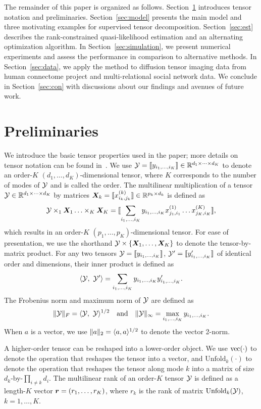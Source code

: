 \documentclass[12pt]{article}
\theoremstyle{definition}
\theoremstyle{definition}
\begin{document}
The remainder of this paper is organized as follows. Section~\ref{sec:pre} introduces tensor notation and preliminaries. Section~\ref{sec:model} presents the main model and three motivating examples for supervised tensor decomposition. Section~\ref{sec:est} describes the rank-constrained quasi-likelihood estimation and an alternating optimization algorithm. In Section~\ref{sec:simulation}, we present numerical experiments and assess the performance in comparison to alternative methods. In Section~\ref{sec:data}, we apply the method to diffusion tensor imaging data from human connectome project and multi-relational social network data. We conclude in Section~\ref{sec:con} with discussions about our findings and avenues of future work.

\section{Preliminaries}\label{sec:pre}
We introduce the basic tensor properties used in the paper; more details on tensor notation can be found in~\cite{kolda2009tensor}. We use $\mathcal{Y}=\llbracket y_{i_1,\ldots,i_K} \rrbracket\in \mathbb{R}^{d_1\times \cdots\times d_K}$ to denote an order-$K$ $(d_1,\ldots,d_K)$-dimensional tensor, where $K$ corresponds to the number of modes of $\mathcal{Y}$ and is called the order. The multilinear multiplication of a tensor $\mathcal{Y}\in\mathbb{R}^{d_1\times \cdots\times d_K}$ by matrices $\bm X_k=\llbracket x_{i_k,j_k}^{(k)} \rrbracket\in\mathbb{R}^{p_k\times d_k}$ is defined as
\begin{equation}
\mathcal{Y} \times_1\bm X_1\ldots \times_K \bm X_K=\llbracket \sum_{i_1,\ldots,i_K}y_{i_1,\ldots,i_K}x_{j_1,i_1}^{(1)}\ldots x_{j_K,i_K}^{(K)} \rrbracket,
\end{equation}
which results in an order-$K$ $(p_1,\ldots,p_K)$-dimensional tensor. For ease of presentation, we use the shorthand $\mathcal{Y}\times\{\bm X_1,\ldots,\bm X_K\}$ to denote the tensor-by-matrix product. For any two tensors $\mathcal{Y}=\llbracket y_{i_1,\ldots,i_K} \rrbracket$, $\mathcal{Y}'=\llbracket y'_{i_1,\ldots,i_K} \rrbracket$ of identical order and dimensions, their inner product is defined as 
\[
\langle \mathcal{Y},\ \mathcal{Y}'\rangle =\sum_{i_1,\ldots,i_K}y_{i_1,\ldots,i_K}y'_{i_1,\ldots,i_K}.
\] 
The Frobenius norm and maximum norm of $\mathcal{Y}$ are defined as 
\[
\lVert\mathcal{Y}\rVert_F=\langle \mathcal{Y},\ \mathcal{Y} \rangle^{1/2}\quad \text{and}\quad \lVert\mathcal{Y}\rVert_\infty=\max_{i_1,\ldots,i_K}y_{i_1,\ldots,i_K}.
\]
When $a$ is a vector, we use $\lVert a\rVert_2=\langle a,a \rangle^{1/2}$ to denote the vector 2-norm. 

A higher-order tensor can be reshaped into a lower-order object. We use $\textup{vec}(\cdot)$ to denote the operation that reshapes the tensor into a vector, and $\text{Unfold}_k(\cdot)$ to denote the operation that reshapes the tensor along mode $k$ into a matrix of size $d_k$-by-$\prod_{i\neq k}d_i$. The multilinear rank of an order-$K$ tensor $\mathcal{Y}$ is defined as a length-$K$ vector $\bm{r}=(r_1,\ldots,r_K)$, where $r_k$ is the rank of matrix $\textup{Unfold}_k(\mathcal{Y})$, $k=1,\ldots,K$.
\end{document}
